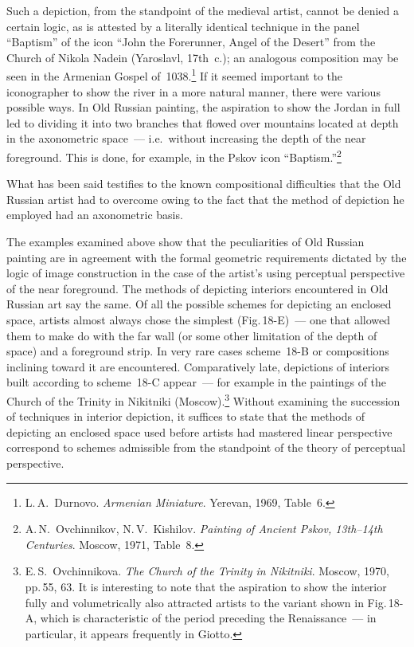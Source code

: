 

Such a depiction, from the standpoint of the medieval artist, cannot be denied a certain
logic, as is attested by a literally identical technique in the panel ``Baptism'' of the
icon ``John the Forerunner, Angel of the Desert'' from the Church of Nikola Nadein
(Yaroslavl, 17th~c.); an analogous composition may be seen in the Armenian Gospel
of~1038.\footnote{%
  L.\,A.~Durnovo. \emph{Armenian Miniature}. Yerevan, 1969, Table~6.}
If it seemed important to the iconographer to show the river in a more natural manner,
there were various possible ways.  In Old Russian painting, the aspiration to show the
Jordan in full led to dividing it into two branches that flowed over mountains located
at depth in the axonometric space~--- i.e.\ without increasing the depth of the near
foreground.  This is done, for example, in the Pskov icon ``Baptism.''\footnote{%
  A.\,N.~Ovchinnikov, N.\,V.~Kishilov.  \emph{Painting of Ancient Pskov,
  13th--14th Centuries}. Moscow, 1971, Table~8.}


What has been said testifies to the known compositional difficulties that the Old Russian
artist had to overcome owing to the fact that the method of depiction he employed had
an axonometric basis.

The examples examined above show that the peculiarities of Old Russian painting are in
agreement with the formal geometric requirements dictated by the logic of image
construction in the case of the artist's using perceptual perspective of the near
foreground.  The methods of depicting interiors encountered in Old Russian art say the
same.  Of all the possible schemes for depicting an enclosed space, artists almost always
chose the simplest (Fig.\,18-E)~--- one that allowed them to make do with the far wall
(or some other limitation of the depth of space) and a foreground strip.  In very rare
cases scheme~18-B or compositions inclining toward it are encountered.  Comparatively
late, depictions of interiors built according to scheme~18-C appear~--- for example in
the paintings of the Church of the Trinity in Nikitniki (Moscow).\footnote{%
  E.\,S.~Ovchinnikova. \emph{The Church of the Trinity in Nikitniki}. Moscow, 1970,
  pp.\,55, 63.  It is interesting to note that the aspiration to show the interior fully and
  volumetrically also attracted artists to the variant shown in Fig.\,18-A, which is
  characteristic of the period preceding the Renaissance~--- in particular, it appears
  frequently in Giotto.}
Without examining the succession of techniques in interior depiction, it suffices to
state that the methods of depicting an enclosed space used before artists had mastered
linear perspective correspond to schemes admissible from the standpoint of the theory
of perceptual perspective.

